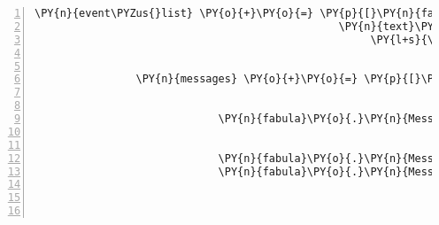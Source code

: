 \begin{Verbatim}[commandchars=\\\{\},numbers=left,firstnumber=1,stepnumber=1]
                \PY{n}{event\PYZus{}list} \PY{o}{+}\PY{o}{=} \PY{p}{[}\PY{n}{fabula}\PY{o}{.}\PY{n}{SaysEvent}\PY{p}{(}\PY{n}{identifier}\PY{o}{=}\PY{n}{ID\PYZus{}CASSANDRA}\PY{p}{,}
                                                \PY{n}{text}\PY{o}{=}\PY{l+s}{\PYZsq{}}\PY{l+s}{Ich habe ein Laute ohne Saiten. }\PY{l+s}{\PYZsq{}}
                                                     \PY{l+s}{\PYZsq{}}\PY{l+s}{Vielleicht können wir sie damit reparieren.}\PY{l+s}{\PYZsq{}}\PY{p}{)}\PY{p}{]}


                \PY{n}{messages} \PY{o}{+}\PY{o}{=} \PY{p}{[}\PY{n}{fabula}\PY{o}{.}\PY{n}{Message}\PY{p}{(}\PY{p}{[}\PY{n}{fabula}\PY{o}{.}\PY{n}{DropsEvent}\PY{p}{(}\PY{n}{ID\PYZus{}KUNI}\PY{p}{,}
                                                               \PY{n+nb+bp}{self}\PY{o}{.}\PY{n}{host}\PY{o}{.}\PY{n}{rack}\PY{o}{.}\PY{n}{entity\PYZus{}dict}\PY{p}{[}\PY{l+s}{\PYZsq{}}\PY{l+s}{string\PYZus{}harp}\PY{l+s}{\PYZsq{}}\PY{p}{]}\PY{p}{,}
                                                               \PY{n}{room}\PY{o}{.}\PY{n}{entity\PYZus{}locations}\PY{p}{[}\PY{n}{ID\PYZus{}KUNI}\PY{p}{]}\PY{p}{)}\PY{p}{]}\PY{p}{)}\PY{p}{,}
                             \PY{n}{fabula}\PY{o}{.}\PY{n}{Message}\PY{p}{(}\PY{p}{[}\PY{n}{fabula}\PY{o}{.}\PY{n}{DropsEvent}\PY{p}{(}\PY{n}{ID\PYZus{}CASSANDRA}\PY{p}{,}
                                                               \PY{n+nb+bp}{self}\PY{o}{.}\PY{n}{host}\PY{o}{.}\PY{n}{rack}\PY{o}{.}\PY{n}{entity\PYZus{}dict}\PY{p}{[}\PY{l+s}{\PYZsq{}}\PY{l+s}{lute\PYZus{}broken}\PY{l+s}{\PYZsq{}}\PY{p}{]}\PY{p}{,}
                                                               \PY{n}{room}\PY{o}{.}\PY{n}{entity\PYZus{}locations}\PY{p}{[}\PY{n}{ID\PYZus{}KUNI}\PY{p}{]}\PY{p}{)}\PY{p}{]}\PY{p}{)}\PY{p}{,}
                             \PY{n}{fabula}\PY{o}{.}\PY{n}{Message}\PY{p}{(}\PY{p}{[}\PY{n}{fabula}\PY{o}{.}\PY{n}{DeleteEvent}\PY{p}{(}\PY{n}{identifier}\PY{o}{=}\PY{l+s}{\PYZsq{}}\PY{l+s}{string\PYZus{}harp}\PY{l+s}{\PYZsq{}}\PY{p}{)}\PY{p}{]}\PY{p}{)}\PY{p}{,}
                             \PY{n}{fabula}\PY{o}{.}\PY{n}{Message}\PY{p}{(}\PY{p}{[}\PY{n}{fabula}\PY{o}{.}\PY{n}{SpawnEvent}\PY{p}{(}\PY{n}{fabula}\PY{o}{.}\PY{n}{Entity}\PY{p}{(}\PY{l+s}{\PYZsq{}}\PY{l+s}{lute}\PY{l+s}{\PYZsq{}}\PY{p}{,}
                                                                             \PY{n}{fabula}\PY{o}{.}\PY{n}{ITEM}\PY{p}{,}
                                                                             \PY{n+nb+bp}{True}\PY{p}{,}
                                                                             \PY{n+nb+bp}{True}\PY{p}{,}

\end{Verbatim}
